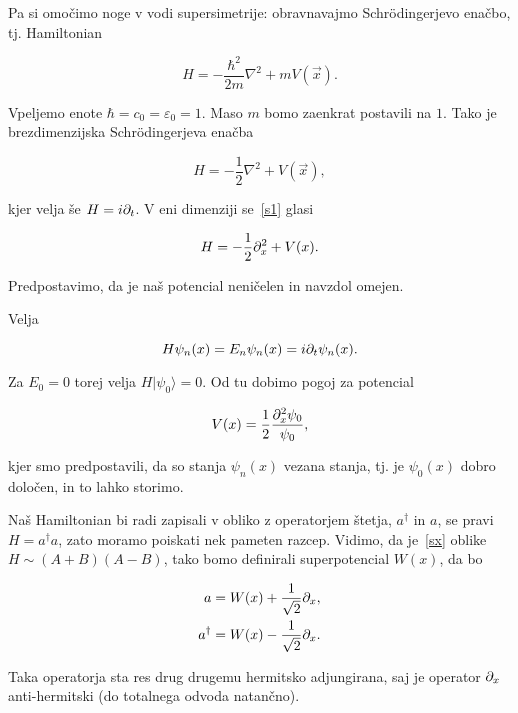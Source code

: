 Pa si omo\v cimo noge v vodi supersimetrije: obravnavajmo Schr\" odingerjevo ena\v cbo, tj. Hamiltonian

\begin{equation}
	H = -\frac{\hbar^2}{2m}\nabla^2 + mV(\vec{x}).
	\label{schroedinger}
\end{equation}

Vpeljemo enote $\hbar = c_0 = \varepsilon_0 = 1$. Maso $m$ bomo zaenkrat postavili na $1$. Tako je brezdimenzijska
Schr\" odingerjeva ena\v cba

\begin{equation}
	H = -\frac{1}{2}\nabla^2 + V(\vec{x}),
	\label{s1}
\end{equation}

kjer velja \v se $H = i\partial_t$. V eni dimenziji se~\eqref{s1} glasi

\begin{equation}
	H = -\frac{1}{2}\partial_x^2 + V(x).
	\label{sx}
\end{equation}

Predpostavimo, da je na\v s potencial neni\v celen in navzdol omejen.

Velja

\begin{equation}
	H\psi_n(x) = E_n\psi_n(x) = i\partial_t\psi_n(x).
\end{equation}

Za $E_0 = 0$ torej velja $H|\psi_0\rangle = 0$. Od tu dobimo pogoj za potencial

\begin{equation}
	V(x) = \frac{1}{2}\frac{\partial_x^2\psi_0}{\psi_0},
	\label{vpogoj}
\end{equation}

kjer smo predpostavili, da so stanja $\psi_n(x)$ vezana stanja, tj. je $\psi_0(x)$ dobro dolo\v cen, in
to lahko storimo.

Na\v s Hamiltonian bi radi zapisali v obliko z operatorjem \v stetja, $a^\dagger$ in $a$, se pravi
$H = a^\dagger a$, zato moramo poiskati nek pameten razcep. Vidimo, da je~\eqref{sx} oblike
$H \sim (A + B)(A - B)$, tako bomo definirali superpotencial $W(x)$, da bo

\begin{align}
	a &= W(x) + \frac{1}{\sqrt{2}}\partial_x, \\
	a^\dagger &= W(x) - \frac{1}{\sqrt{2}}\partial_x.
\end{align}

Taka operatorja sta res drug drugemu hermitsko adjungirana, saj je operator $\partial_x$ anti-hermitski (do totalnega
odvoda natan\v cno).

